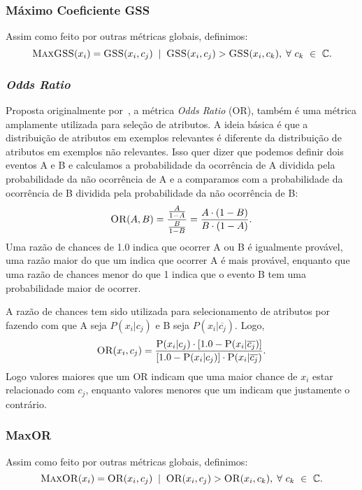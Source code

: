 \subsubsection{Máximo Coeficiente GSS}
\label{subsubsection::maxgss}

Assim como feito por outras métricas globais, definimos:
\begin{equation}\label{eqn::maxgss}
\textsc{MaxGSS}(x_i) = \textsc{GSS}(x_i,c_j) \; \; | \;\; \textsc{GSS}(x_i, c_j) > \textsc{GSS}(x_i, c_k), \; \forall\ c_k\ \in\ \mathbb{C}.
\end{equation}

\subsubsection{\textit{Odds Ratio}}
\label{subsubsection::or}

Proposta originalmente por~\cite{Rijsbergen79}, a métrica \textit{Odds Ratio} (\textsc{OR}), também é uma métrica amplamente utilizada para seleção de atributos. A ideia básica é que a distribuição de atributos em exemplos relevantes é diferente da distribuição de atributos em exemplos não relevantes. Isso quer dizer que podemos definir dois eventos A e B e calculamos a probabilidade da ocorrência de A dividida pela probabilidade da não ocorrência de A e a comparamos com a probabilidade da ocorrência de B dividida pela probabilidade da não ocorrência de B:
\begin{equation}\label{eqn::or}
   \textsc{OR}(A, B) = \frac{\frac{A}{1-A}} {\frac{B}{1-B}} = \frac{ A \cdot ( 1 - B )} { B \cdot ( 1 - A ) } .
\end{equation}
Uma razão de chances de 1.0 indica que ocorrer A ou B é igualmente provável, uma razão maior do que um indica que ocorrer A é mais provável, enquanto que uma razão de chances menor do que 1 indica que o evento B tem uma probabilidade maior de ocorrer.

A razão de chances tem sido utilizada para selecionamento de atributos por \cite{Mladenic98} fazendo com que A seja $P(x_i|c_j)$ e B seja $P(x_i|\overline{c_j})$. Logo,
\begin{equation}\label{eqn::or}
   \textsc{OR}(x_i, c_j) = \frac{ \textsc{P}(x_i|c_j) \cdot [ 1.0 - \textsc{P}(x_i|\overline{c_j}) ] }{ [ 1.0 - \textsc{P}(x_i|c_j) ] \cdot \textsc{P}(x_i|\overline{c_j})}.
\end{equation}
Logo valores maiores que um \textsc{OR} indicam que uma maior chance de $x_i$ estar relacionado com $c_j$, enquanto valores menores que um indicam que justamente o contrário.

\subsubsection{MaxOR}
\label{subsubsection::maxor}
Assim como feito por outras métricas globais, definimos:
\begin{equation}\label{eqn::maxor}
\textsc{MaxOR}(x_i) = \textsc{OR}(x_i,c_j) \; \; | \;\; \textsc{OR}(x_i, c_j) > \textsc{OR}(x_i, c_k), \; \forall\ c_k\ \in\ \mathbb{C}.
\end{equation}


